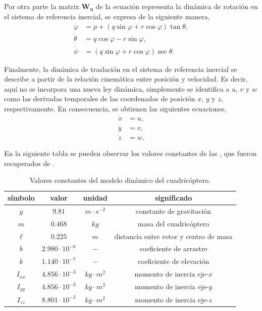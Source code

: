 Por otra parte la matrix $\mathbf{W}_{\bm{\eta}}$ de la ecuación  representa la dinámica de rotación en el sistema de referencia inercial, se expresa de la siguiente manera,
\begin{align}
    \dot \varphi &= p + (q \sin\varphi + r \cos\varphi) \tan\theta \label{eq:phi},\\
    \dot \theta &= q \cos\varphi - r \sin\varphi \label{eq:theta}, \\ 
    \dot \psi &= \left(q \sin\varphi + r \cos\varphi\right) \sec\theta \label{eq:psi}.
\end{align}

Finalmente, la dinámica de traslación en el sistema de referencia inercial se describe a partir de la relación cinemática entre posición y velocidad. Es decir, aquí no se incorpora una nueva ley dinámica, simplemente se identifica a $u$, $v$ y $w$ como las derivadas temporales de las coordenadas de posición $x$, $y$ y $z$, respectivamente. En consecuencia, se obtienen las siguientes ecuaciones, 
\begin{align}
    \dot x &= u \label{eq:x},\\
    \dot y &= v \label{eq:y},\\
    \dot z &= w \label{eq:z}.
\end{align}

En la siguiente tabla se pueden observar los valores constantes de las , que fueron recuperados de \cite{fossen_2013}.

\begin{table}[H]
\centering
\caption{Valores constantes del modelo dinámico del cuadricóptero.}
\label{tab:quadcopter_cons}
\begin{tabular}{|c|c|c|c|}
\hline
 \textbf{símbolo}& \textbf{valor} & \textbf{unidad} & \textbf{significado} \\ \hline
 $g$& $9.81$ & $m \cdot s^{-2}$ & constante de gravitación \\ 
 $m$ & $0.468$ & $kg$ & masa del cuadricóptero \\ 
 $\ell$ & $0.225$ & $m$ & distancia entre rotor y centro de masa \\ 
 $b$ & $2.980 \cdot 10^{-6}$ & $-$ & coeficiente de arrastre  \\ 
 $k$& $1.140 \cdot 10^{-7}$ & $-$  & coeficiente de elevación \\ 
 $I_{xx}$& $4.856 \cdot 10^{-3}$ & $kg \cdot m^2$& momento de inercia eje-$x$ \\ 
 $I_{yy}$& $4.856 \cdot 10^{-3}$ & $kg \cdot m^2$& momento de inercia eje-$y$\\ 
 $I_{zz}$& $8.801 \cdot 10^{-3}$ & $kg \cdot m^2$& momento de inercia eje-$z$\\ 
 \hline
\end{tabular}
\end{table}



